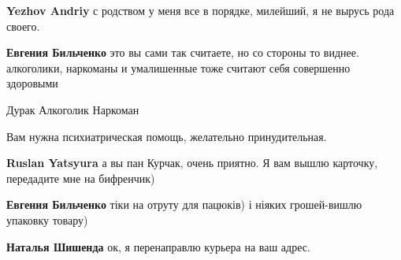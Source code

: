 \begin{itemize}
\begin{itemize}
\textbf{Yezhov Andriy} с родством у меня все в порядке, милейший, я не вырусь рода своего.

 
\textbf{Евгения Бильченко} это вы сами так считаете, но со стороны то виднее. алкоголики, наркоманы и умалишенные тоже считают себя совершенно здоровыми

 
Дурак
Алкоголик
Наркоман
\end{itemize}

 
Вам нужна психиатрическая помощь, желательно принудительная.

\begin{itemize}
 
\textbf{Ruslan Yatsyura} а вы пан Курчак, очень приятно. Я вам вышлю карточку, передадите мне на бифренчик)

 
\textbf{Евгения Бильченко} тіки на отруту для пацюків) і ніяких грошей-вишлю упаковку товару)

 
\textbf{Наталья Шишенда} ок, я перенаправлю курьера на ваш адрес.


\end{itemize}
\end{itemize}
